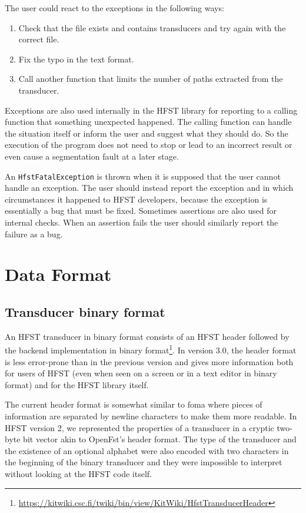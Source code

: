 \documentclass{llncs}
\begin{document}
The user could react to the exceptions in the following ways:

\begin{enumerate} 
\item Check that the file exists and contains transducers and try again
with the correct file.
\item Fix the typo in the text format.
\item Call another function that limits the number of paths extracted
from the transducer.
\end{enumerate} 

Exceptions are also used internally in the HFST library for reporting to a 
calling function that something unexpected happened. The calling
function can handle the situation itself or inform the user and suggest
what they should do. 
So the execution of the program does not need to stop or lead to an
incorrect result or even cause a segmentation fault at a later stage.

An \texttt{HfstFatalException} is thrown when it is supposed that the user
cannot handle an exception. The user should instead report the exception
and in which circumstances it happened to HFST developers, because the exception
is essentially a bug that must be fixed. Sometimes assertions are also
used for internal checks. When an assertion fails the user should similarly
report the failure as a bug.


\section{Data Format}

\subsection{Transducer binary format}

An HFST transducer in binary format consists of an HFST header followed by the
backend implementation in binary 
format\footnote{\url{https://kitwiki.csc.fi/twiki/bin/view/KitWiki/HfstTransducerHeader}}. 
In version 3.0, the header
format is less error-prone than in the previous version and gives more 
information both for users of HFST (even when seen on a screen or in a
text editor in binary format) and for the HFST library itself.
 
The current header format is somewhat similar to foma where pieces of 
information are separated by newline characters to make them more
readable. In HFST version 2, we represented the properties of a
transducer in a cryptic two-byte bit vector akin to OpenFst's header
format. The type of the transducer and the existence of an optional
alphabet were also encoded with two characters in the beginning of the
binary transducer and they were impossible to interpret without
looking at the HFST code itself.
\end{document}
